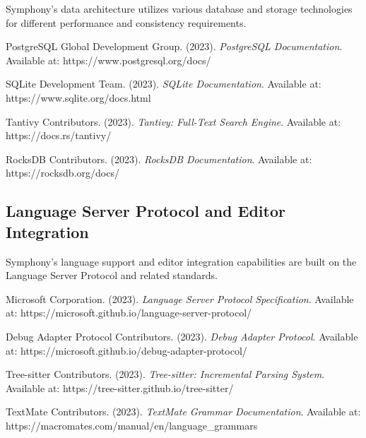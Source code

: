 Symphony's data architecture utilizes various database and storage technologies for different performance and consistency requirements.

\begin{compactlist}
    \item PostgreSQL Global Development Group. (2023). \textit{PostgreSQL Documentation}. Available at: https://www.postgresql.org/docs/
    \item SQLite Development Team. (2023). \textit{SQLite Documentation}. Available at: https://www.sqlite.org/docs.html
    \item Tantivy Contributors. (2023). \textit{Tantivy: Full-Text Search Engine}. Available at: https://docs.rs/tantivy/
    \item RocksDB Contributors. (2023). \textit{RocksDB Documentation}. Available at: https://rocksdb.org/docs/
\end{compactlist}

\subsection*{Language Server Protocol and Editor Integration}

Symphony's language support and editor integration capabilities are built on the Language Server Protocol and related standards.

\begin{compactlist}
    \item Microsoft Corporation. (2023). \textit{Language Server Protocol Specification}. Available at: https://microsoft.github.io/language-server-protocol/
    \item Debug Adapter Protocol Contributors. (2023). \textit{Debug Adapter Protocol}. Available at: https://microsoft.github.io/debug-adapter-protocol/
    \item Tree-sitter Contributors. (2023). \textit{Tree-sitter: Incremental Parsing System}. Available at: https://tree-sitter.github.io/tree-sitter/
    \item TextMate Contributors. (2023). \textit{TextMate Grammar Documentation}. Available at: https://macromates.com/manual/en/language\_grammars
\end{compactlist}
